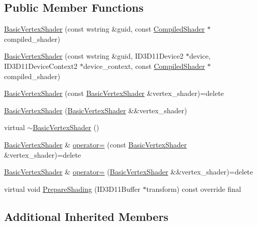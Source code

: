 \subsection*{Public Member Functions}
\begin{DoxyCompactItemize}
\item 
\hyperlink{classmage_1_1_basic_vertex_shader_a4d9dbb1b45331cb1fd7b80aeff2a5187}{Basic\+Vertex\+Shader} (const wstring \&guid, const \hyperlink{structmage_1_1_compiled_shader}{Compiled\+Shader} $\ast$compiled\+\_\+shader)
\item 
\hyperlink{classmage_1_1_basic_vertex_shader_a0ef91cf08f63162763a3ed3216cf287c}{Basic\+Vertex\+Shader} (const wstring \&guid, I\+D3\+D11\+Device2 $\ast$device, I\+D3\+D11\+Device\+Context2 $\ast$device\+\_\+context, const \hyperlink{structmage_1_1_compiled_shader}{Compiled\+Shader} $\ast$compiled\+\_\+shader)
\item 
\hyperlink{classmage_1_1_basic_vertex_shader_ab547bf423545c41882a691ff3ebb32ce}{Basic\+Vertex\+Shader} (const \hyperlink{classmage_1_1_basic_vertex_shader}{Basic\+Vertex\+Shader} \&vertex\+\_\+shader)=delete
\item 
\hyperlink{classmage_1_1_basic_vertex_shader_a1c5f899e5dfaf81609e8e8fd73103ab2}{Basic\+Vertex\+Shader} (\hyperlink{classmage_1_1_basic_vertex_shader}{Basic\+Vertex\+Shader} \&\&vertex\+\_\+shader)
\item 
virtual \hyperlink{classmage_1_1_basic_vertex_shader_ad155c4135f5517667020ec519a3597c9}{$\sim$\+Basic\+Vertex\+Shader} ()
\item 
\hyperlink{classmage_1_1_basic_vertex_shader}{Basic\+Vertex\+Shader} \& \hyperlink{classmage_1_1_basic_vertex_shader_ab3d355e76715b24e21fb37c239d41932}{operator=} (const \hyperlink{classmage_1_1_basic_vertex_shader}{Basic\+Vertex\+Shader} \&vertex\+\_\+shader)=delete
\item 
\hyperlink{classmage_1_1_basic_vertex_shader}{Basic\+Vertex\+Shader} \& \hyperlink{classmage_1_1_basic_vertex_shader_ae5442c36b5f913ac6644cc2945a8c20a}{operator=} (\hyperlink{classmage_1_1_basic_vertex_shader}{Basic\+Vertex\+Shader} \&\&vertex\+\_\+shader)=delete
\item 
virtual void \hyperlink{classmage_1_1_basic_vertex_shader_ae565cb19b96591d5d1ff36ac0ff7344c}{Prepare\+Shading} (I\+D3\+D11\+Buffer $\ast$transform) const override final
\end{DoxyCompactItemize}
\subsection*{Additional Inherited Members}


